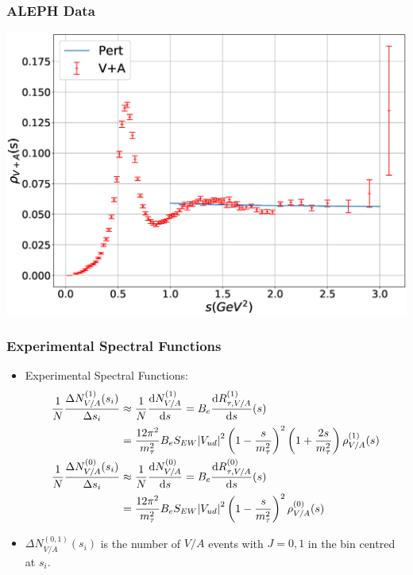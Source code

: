 \documentclass{beamer}
\begin{document}
\begin{frame}
  \frametitle{ALEPH Data}
  \includegraphics[width=.9\textwidth]{./images/specFuncAleph_VpA.eps}
\end{frame}

\begin{frame}
  \frametitle{Experimental Spectral Functions}
  \begin{itemize}
  \item Experimental Spectral Functions:
    \begin{align}
      \frac{1}{N} \frac{\Delta N_{V/A}^{(1)}(s_i)}{\Delta s_i}
      &\approx \frac{1}{N} \frac{\dif N_{V/A}^{(1)}}{\dif s} = B_e \frac{\dif R_{\tau, V/A}^{(1)}}{\dif s}(s) \nonumber\\
      &= \frac{12\pi^2}{m_\tau^2} B_e S_{EW} \abs{V_{ud}}^2
        \left( 1 - \frac{s}{m_\tau^2} \right)^2\left( 1 + \frac{2s}{m_\tau^2} \right) \rho_{V/A}^{(1)}(s) \\
      \frac{1}{N} \frac{\Delta N_{V/A}^{(0)}(s_i)}{\Delta s_i}
      &\approx \frac{1}{N} \frac{\dif N_{V/A}^{(0)}}{\dif s} = B_e \frac{\dif R_{\tau, V/A}^{(0)}}{\dif s}(s) \nonumber\\
      &= \frac{12\pi^2}{m_\tau^2} B_e S_{EW} \abs{V_{ud}}^2
        \left( 1 - \frac{s}{m_\tau^2} \right)^2 \rho_{V/A}^{(0)}(s)
    \end{align}
  \item \(\Delta N_{V/A}^{(0,1)}(s_i)\) is the number of \(V/A\) events with
    \(J=0,1\) in the bin centred at \(s_i\).
  \end{itemize}
\end{frame}
\end{document}
